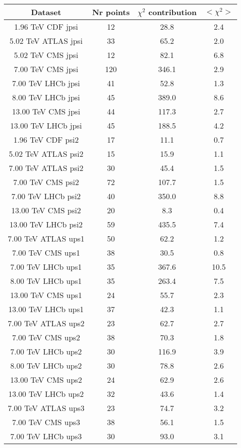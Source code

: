 \begin{table}[h!]
\centering
\begin{tabular}{c|c|c|c}
Dataset & Nr points & $\chi^2$ contribution & $<\chi^2>$ \\
\hline
1.96 TeV CDF jpsi & 12 & 28.8 & 2.4 \\
5.02 TeV ATLAS jpsi & 33 & 65.2 & 2.0 \\
5.02 TeV CMS jpsi & 12 & 82.1 & 6.8 \\
7.00 TeV CMS jpsi & 120 & 346.1 & 2.9 \\
7.00 TeV LHCb jpsi & 41 & 52.8 & 1.3 \\
8.00 TeV LHCb jpsi & 45 & 389.0 & 8.6 \\
13.00 TeV CMS jpsi & 44 & 117.3 & 2.7 \\
13.00 TeV LHCb jpsi & 45 & 188.5 & 4.2 \\
1.96 TeV CDF psi2 & 17 & 11.1 & 0.7 \\
5.02 TeV ATLAS psi2 & 15 & 15.9 & 1.1 \\
7.00 TeV ATLAS psi2 & 30 & 45.4 & 1.5 \\
7.00 TeV CMS psi2 & 72 & 107.7 & 1.5 \\
7.00 TeV LHCb psi2 & 40 & 350.0 & 8.8 \\
13.00 TeV CMS psi2 & 20 & 8.3 & 0.4 \\
13.00 TeV LHCb psi2 & 59 & 435.5 & 7.4 \\
7.00 TeV ATLAS ups1 & 50 & 62.2 & 1.2 \\
7.00 TeV CMS ups1 & 38 & 30.5 & 0.8 \\
7.00 TeV LHCb ups1 & 35 & 367.6 & 10.5 \\
8.00 TeV LHCb ups1 & 35 & 263.4 & 7.5 \\
13.00 TeV CMS ups1 & 24 & 55.7 & 2.3 \\
13.00 TeV LHCb ups1 & 37 & 42.3 & 1.1 \\
7.00 TeV ATLAS ups2 & 23 & 62.7 & 2.7 \\
7.00 TeV CMS ups2 & 38 & 70.3 & 1.8 \\
7.00 TeV LHCb ups2 & 30 & 116.9 & 3.9 \\
8.00 TeV LHCb ups2 & 30 & 78.8 & 2.6 \\
13.00 TeV CMS ups2 & 24 & 62.9 & 2.6 \\
13.00 TeV LHCb ups2 & 32 & 43.6 & 1.4 \\
7.00 TeV ATLAS ups3 & 23 & 74.7 & 3.2 \\
7.00 TeV CMS ups3 & 38 & 56.1 & 1.5 \\
7.00 TeV LHCb ups3 & 30 & 93.0 & 3.1 \\

\end{tabular}
\end{table}
